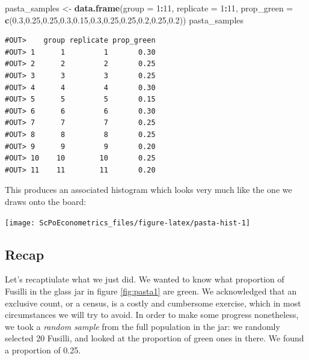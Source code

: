 \documentclass[]{book}
\newenvironment{Shaded}{\begin{snugshade}}{\end{snugshade}}
\newcommand{\DataTypeTok}[1]{\textcolor[rgb]{0.13,0.29,0.53}{#1}}
\newcommand{\DecValTok}[1]{\textcolor[rgb]{0.00,0.00,0.81}{#1}}
\newcommand{\FloatTok}[1]{\textcolor[rgb]{0.00,0.00,0.81}{#1}}
\newcommand{\KeywordTok}[1]{\textcolor[rgb]{0.13,0.29,0.53}{\textbf{#1}}}
\newcommand{\NormalTok}[1]{#1}
\newcommand{\OperatorTok}[1]{\textcolor[rgb]{0.81,0.36,0.00}{\textbf{#1}}}
\newcommand{\StringTok}[1]{\textcolor[rgb]{0.31,0.60,0.02}{#1}}
\begin{document}
\begin{Shaded}
\begin{Highlighting}[]
\NormalTok{pasta_samples <-}\StringTok{ }\KeywordTok{data.frame}\NormalTok{(}\DataTypeTok{group =} \DecValTok{1}\OperatorTok{:}\DecValTok{11}\NormalTok{, }\DataTypeTok{replicate =} \DecValTok{1}\OperatorTok{:}\DecValTok{11}\NormalTok{, }\DataTypeTok{prop_green =} \KeywordTok{c}\NormalTok{(}\FloatTok{0.3}\NormalTok{,}\FloatTok{0.25}\NormalTok{,}\FloatTok{0.25}\NormalTok{,}\FloatTok{0.3}\NormalTok{,}\FloatTok{0.15}\NormalTok{,}\FloatTok{0.3}\NormalTok{,}\FloatTok{0.25}\NormalTok{,}\FloatTok{0.25}\NormalTok{,}\FloatTok{0.2}\NormalTok{,}\FloatTok{0.25}\NormalTok{,}\FloatTok{0.2}\NormalTok{))}
\NormalTok{pasta_samples}
\end{Highlighting}
\end{Shaded}

\begin{verbatim}
#OUT>    group replicate prop_green
#OUT> 1      1         1       0.30
#OUT> 2      2         2       0.25
#OUT> 3      3         3       0.25
#OUT> 4      4         4       0.30
#OUT> 5      5         5       0.15
#OUT> 6      6         6       0.30
#OUT> 7      7         7       0.25
#OUT> 8      8         8       0.25
#OUT> 9      9         9       0.20
#OUT> 10    10        10       0.25
#OUT> 11    11        11       0.20
\end{verbatim}

This produces an associated histogram which looks very much like the one we draws onto the board:

\begin{center}\texttt{[image: ScPoEconometrics\_files/figure-latex/pasta-hist-1]} \end{center}

\hypertarget{recap}{%
\subsection{Recap}\label{recap}}

Let's recaptiulate what we just did. We wanted to know what proportion of Fusilli in the glass jar in figure \ref{fig:pasta1} are green. We acknowledged that an exclusive count, or a census, is a costly and cumbersome exercise, which in most circumstances we will try to avoid. In order to make some progress nonetheless, we took a \emph{random sample} from the full population in the jar: we randomly selected 20 Fusilli, and looked at the proportion of green ones in there. We found a proportion of 0.25.
\end{document}
